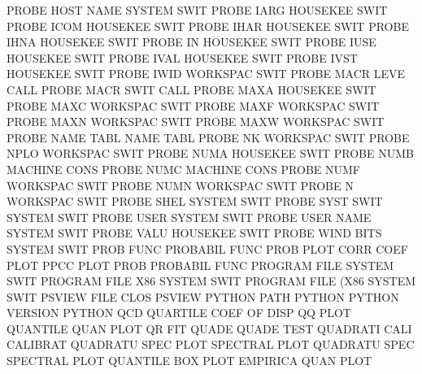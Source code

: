 PROBE    HOST NAME                      SYSTEM   SWIT
PROBE    IARG                           HOUSEKEE SWIT
PROBE    ICOM                           HOUSEKEE SWIT
PROBE    IHAR                           HOUSEKEE SWIT
PROBE    IHNA                           HOUSEKEE SWIT
PROBE    IN                             HOUSEKEE SWIT
PROBE    IUSE                           HOUSEKEE SWIT
PROBE    IVAL                           HOUSEKEE SWIT
PROBE    IVST                           HOUSEKEE SWIT
PROBE    IWID                           WORKSPAC SWIT
PROBE    MACR LEVE                      CALL
PROBE    MACR SWIT                      CALL
PROBE    MAXA                           HOUSEKEE SWIT
PROBE    MAXC                           WORKSPAC SWIT
PROBE    MAXF                           WORKSPAC SWIT
PROBE    MAXN                           WORKSPAC SWIT
PROBE    MAXW                           WORKSPAC SWIT
PROBE    NAME TABL                      NAME     TABL
PROBE    NK                             WORKSPAC SWIT
PROBE    NPLO                           WORKSPAC SWIT
PROBE    NUMA                           HOUSEKEE SWIT
PROBE    NUMB                           MACHINE  CONS
PROBE    NUMC                           MACHINE  CONS
PROBE    NUMF                           WORKSPAC SWIT
PROBE    NUMN                           WORKSPAC SWIT
PROBE    N                              WORKSPAC SWIT
PROBE    SHEL                           SYSTEM   SWIT
PROBE    SYST SWIT                      SYSTEM   SWIT
PROBE    USER                           SYSTEM   SWIT
PROBE    USER NAME                      SYSTEM   SWIT
PROBE    VALU                           HOUSEKEE SWIT
PROBE    WIND BITS                      SYSTEM   SWIT
PROB     FUNC                           PROBABIL FUNC
PROB     PLOT CORR COEF PLOT            PPCC     PLOT
PROB                                    PROBABIL FUNC
PROGRAM  FILE                           SYSTEM   SWIT
PROGRAM  FILE X86                       SYSTEM   SWIT
PROGRAM  FILE (X86                      SYSTEM   SWIT
PSVIEW   FILE CLOS                      PSVIEW
PYTHON   PATH                           PYTHON
PYTHON   VERSION                        PYTHON
QCD                                     QUARTILE COEF OF   DISP
QQ       PLOT                           QUANTILE QUAN PLOT
QR                                      FIT
QUADE                                   QUADE    TEST
QUADRATI CALI                           CALIBRAT
QUADRATU SPEC PLOT                      SPECTRAL PLOT
QUADRATU SPEC                           SPECTRAL PLOT
QUANTILE BOX  PLOT                      EMPIRICA QUAN PLOT
